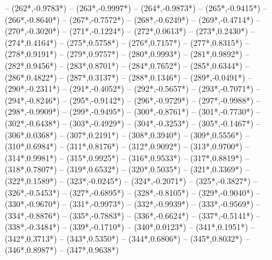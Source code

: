 {		-- ({262*\dx},{-0.9783*\dy})
		-- ({263*\dx},{-0.9997*\dy})
		-- ({264*\dx},{-0.9873*\dy})
		-- ({265*\dx},{-0.9415*\dy})
		-- ({266*\dx},{-0.8640*\dy})
		-- ({267*\dx},{-0.7572*\dy})
		-- ({268*\dx},{-0.6249*\dy})
		-- ({269*\dx},{-0.4714*\dy})
		-- ({270*\dx},{-0.3020*\dy})
		-- ({271*\dx},{-0.1224*\dy})
		-- ({272*\dx},{0.0613*\dy})
		-- ({273*\dx},{0.2430*\dy})
		-- ({274*\dx},{0.4164*\dy})
		-- ({275*\dx},{0.5758*\dy})
		-- ({276*\dx},{0.7157*\dy})
		-- ({277*\dx},{0.8315*\dy})
		-- ({278*\dx},{0.9191*\dy})
		-- ({279*\dx},{0.9757*\dy})
		-- ({280*\dx},{0.9993*\dy})
		-- ({281*\dx},{0.9892*\dy})
		-- ({282*\dx},{0.9456*\dy})
		-- ({283*\dx},{0.8701*\dy})
		-- ({284*\dx},{0.7652*\dy})
		-- ({285*\dx},{0.6344*\dy})
		-- ({286*\dx},{0.4822*\dy})
		-- ({287*\dx},{0.3137*\dy})
		-- ({288*\dx},{0.1346*\dy})
		-- ({289*\dx},{-0.0491*\dy})
		-- ({290*\dx},{-0.2311*\dy})
		-- ({291*\dx},{-0.4052*\dy})
		-- ({292*\dx},{-0.5657*\dy})
		-- ({293*\dx},{-0.7071*\dy})
		-- ({294*\dx},{-0.8246*\dy})
		-- ({295*\dx},{-0.9142*\dy})
		-- ({296*\dx},{-0.9729*\dy})
		-- ({297*\dx},{-0.9988*\dy})
		-- ({298*\dx},{-0.9909*\dy})
		-- ({299*\dx},{-0.9495*\dy})
		-- ({300*\dx},{-0.8761*\dy})
		-- ({301*\dx},{-0.7730*\dy})
		-- ({302*\dx},{-0.6438*\dy})
		-- ({303*\dx},{-0.4929*\dy})
		-- ({304*\dx},{-0.3253*\dy})
		-- ({305*\dx},{-0.1467*\dy})
		-- ({306*\dx},{0.0368*\dy})
		-- ({307*\dx},{0.2191*\dy})
		-- ({308*\dx},{0.3940*\dy})
		-- ({309*\dx},{0.5556*\dy})
		-- ({310*\dx},{0.6984*\dy})
		-- ({311*\dx},{0.8176*\dy})
		-- ({312*\dx},{0.9092*\dy})
		-- ({313*\dx},{0.9700*\dy})
		-- ({314*\dx},{0.9981*\dy})
		-- ({315*\dx},{0.9925*\dy})
		-- ({316*\dx},{0.9533*\dy})
		-- ({317*\dx},{0.8819*\dy})
		-- ({318*\dx},{0.7807*\dy})
		-- ({319*\dx},{0.6532*\dy})
		-- ({320*\dx},{0.5035*\dy})
		-- ({321*\dx},{0.3369*\dy})
		-- ({322*\dx},{0.1589*\dy})
		-- ({323*\dx},{-0.0245*\dy})
		-- ({324*\dx},{-0.2071*\dy})
		-- ({325*\dx},{-0.3827*\dy})
		-- ({326*\dx},{-0.5453*\dy})
		-- ({327*\dx},{-0.6895*\dy})
		-- ({328*\dx},{-0.8105*\dy})
		-- ({329*\dx},{-0.9040*\dy})
		-- ({330*\dx},{-0.9670*\dy})
		-- ({331*\dx},{-0.9973*\dy})
		-- ({332*\dx},{-0.9939*\dy})
		-- ({333*\dx},{-0.9569*\dy})
		-- ({334*\dx},{-0.8876*\dy})
		-- ({335*\dx},{-0.7883*\dy})
		-- ({336*\dx},{-0.6624*\dy})
		-- ({337*\dx},{-0.5141*\dy})
		-- ({338*\dx},{-0.3484*\dy})
		-- ({339*\dx},{-0.1710*\dy})
		-- ({340*\dx},{0.0123*\dy})
		-- ({341*\dx},{0.1951*\dy})
		-- ({342*\dx},{0.3713*\dy})
		-- ({343*\dx},{0.5350*\dy})
		-- ({344*\dx},{0.6806*\dy})
		-- ({345*\dx},{0.8032*\dy})
		-- ({346*\dx},{0.8987*\dy})
		-- ({347*\dx},{0.9638*\dy})
}
